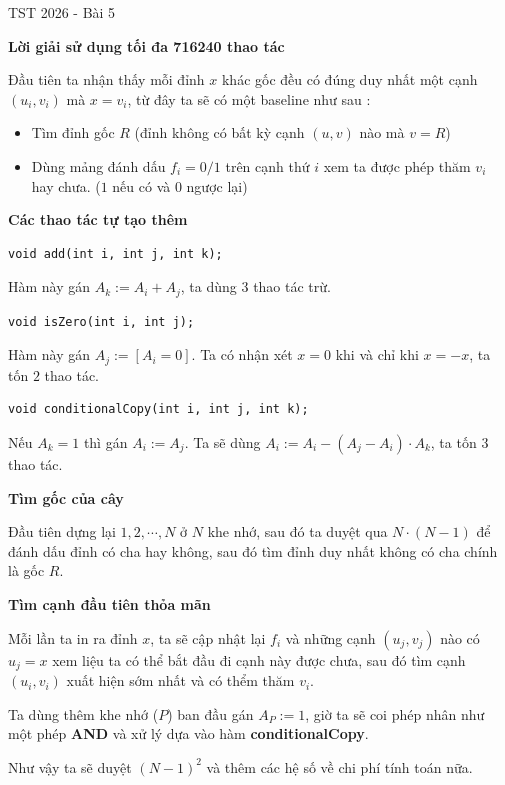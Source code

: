 \begin{tutorial}{TST 2026 - Bài 5 }

\LARGE{\textbf{Lời giải sử dụng tối đa 716240 thao tác}}

Đầu tiên ta nhận thấy mỗi đỉnh $x$ khác gốc đều có đúng duy nhất một cạnh $(u_i, v_i)$ mà $x = v_i$, từ đây ta sẽ có một baseline như sau : 
\begin{itemize}
 \item Tìm đỉnh gốc $R$ (đỉnh không có bất kỳ cạnh $(u, v)$ nào mà $v = R$)
 \item Dùng mảng đánh dấu $f_i = 0/1$ trên cạnh thứ $i$ xem ta được phép thăm $v_i$ hay chưa. ($1$ nếu có và $0$ ngược lại)
\end{itemize}

\Large{\textbf{Các thao tác tự tạo thêm}}

\begin{lstlisting}
void add(int i, int j, int k);
\end{lstlisting}

Hàm này gán $A_k := A_i + A_j$, ta dùng $3$ thao tác trừ.

\begin{lstlisting}
void isZero(int i, int j);
\end{lstlisting}

Hàm này gán $A_j := [A_i = 0]$. Ta có nhận xét $x = 0$ khi và chỉ khi $x = -x$, ta tốn $2$ thao tác.

\begin{lstlisting}
void conditionalCopy(int i, int j, int k);
\end{lstlisting}

Nếu $A_k = 1$ thì gán $A_i := A_j$. Ta sẽ dùng $A_i := A_i - (A_j - A_i) \cdot A_k$, ta tốn $3$ thao tác. 

\Large{\textbf{Tìm gốc của cây}}

Đầu tiên dựng lại $1, 2, \cdots, N$ ở $N$ khe nhớ, sau đó ta duyệt qua $N \cdot (N - 1)$ để đánh dấu đỉnh có cha hay không, sau đó tìm đỉnh duy nhất không có cha chính là gốc $R$.

\Large{\textbf{Tìm cạnh đầu tiên thỏa mãn}}

Mỗi lần ta in ra đỉnh $x$, ta sẽ cập nhật lại $f_i$ và những cạnh $(u_j, v_j)$ nào có $u_j = x$ xem liệu ta có thể bắt đầu đi cạnh này được chưa, sau đó tìm cạnh $(u_i, v_i)$ xuất hiện sớm nhất và có thểm thăm $v_i$.

Ta dùng thêm khe nhớ ($P$) ban đầu gán $A_P := 1$, giờ ta sẽ coi phép nhân như một phép \textbf{AND} và xử lý dựa vào hàm \textbf{conditionalCopy}.

Như vậy ta sẽ duyệt $(N - 1)^2$ và thêm các hệ số về chi phí tính toán nữa.

\end{tutorial}
